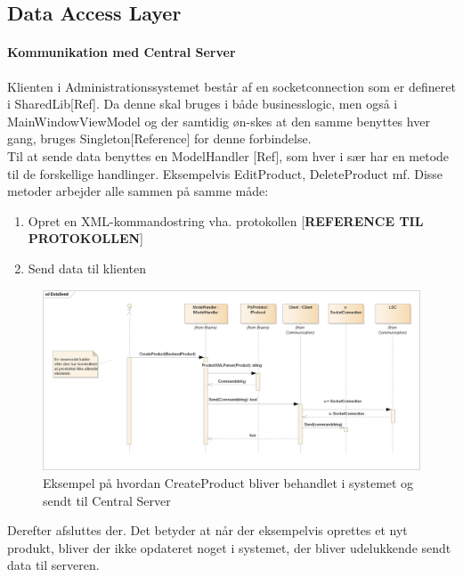 \subsection{Data Access Layer}




\paragraph*{Kommunikation med Central Server}
Klienten i Administrationssystemet består af en socketconnection som er defineret i SharedLib[Ref]. Da denne skal bruges i både businesslogic, men også i MainWindowViewModel og der samtidig øn-skes at den samme benyttes hver gang, bruges Singleton[Reference] for denne forbindelse. \\
Til at sende data benyttes en ModelHandler [Ref], som hver i sær har en metode til de forskellige handlinger. Eksempelvis EditProduct, DeleteProduct mf. Disse metoder arbejder alle sammen på samme måde:
\begin{enumerate}
\item Opret en XML-kommandostring vha. protokollen [\textbf{REFERENCE TIL PROTOKOLLEN}]
\item Send data til klienten
\end{enumerate}


\begin{figure}[!h]
    \centering
    \includegraphics[width=1\textwidth]{Systemdesign/backend/Images/DataSend.png}
    \caption{Eksempel på hvordan CreateProduct bliver behandlet i systemet og sendt til Central Server}
    \label{fig:CreateSend}
\end{figure}

Derefter afsluttes der. Det betyder at når der eksempelvis oprettes et nyt produkt, bliver der ikke opdateret noget i systemet, der bliver udelukkende sendt data til serveren.\\


